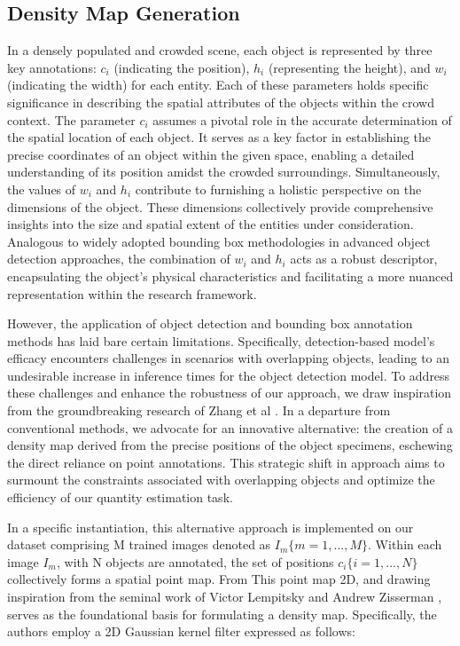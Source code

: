 \documentclass[journal]{IEEEtran}
\begin{document}
\subsection{Density Map Generation}
In a densely populated and crowded scene, each object is represented by three key annotations: $c_i$ (indicating the position), $h_i$ (representing the height), and $w_i$ (indicating the width) for each entity. Each of these parameters holds specific significance in describing the spatial attributes of the objects within the crowd context. The parameter $c_i$ assumes a pivotal role in the accurate determination of the spatial location of each object. It serves as a key factor in establishing the precise coordinates of an object within the given space, enabling a detailed understanding of its position amidst the crowded surroundings. Simultaneously, the values of $w_i$ and $h_i$ contribute to furnishing a holistic perspective on the dimensions of the object. These dimensions collectively provide comprehensive insights into the size and spatial extent of the entities under consideration. Analogous to widely adopted bounding box methodologies in advanced object detection approaches, the combination of $w_i$ and $h_i$ acts as a robust descriptor, encapsulating the object's physical characteristics and facilitating a more nuanced representation within the research framework.

However, the application of object detection and bounding box annotation methods has laid bare certain limitations. Specifically, detection-based model's efficacy encounters challenges in scenarios with overlapping objects, leading to an undesirable increase in inference times for the object detection model\cite{firstdensity}. To address these challenges and enhance the robustness of our approach, we draw inspiration from the groundbreaking research of Zhang et al \cite{mcnn}. In a departure from conventional methods, we advocate for an innovative alternative: the creation of a density map derived from the precise positions of the object specimens, eschewing the direct reliance on point annotations. This strategic shift in approach aims to surmount the constraints associated with overlapping objects and optimize the efficiency of our quantity estimation task.

In a specific instantiation, this alternative approach is implemented on our dataset comprising M trained images denoted as $I_m \{m=1,...,M\}$. Within each image $I_m$, with N objects are annotated, the set of positions $c_i\{i=1,...,N\}$ collectively forms a spatial point map. From This point map 2D, and drawing inspiration from the seminal work of Victor Lempitsky and Andrew Zisserman \cite{firstdensity}, serves as the foundational basis for formulating a density map. Specifically, the authors employ a 2D Gaussian kernel filter expressed as follows:
\end{document}
